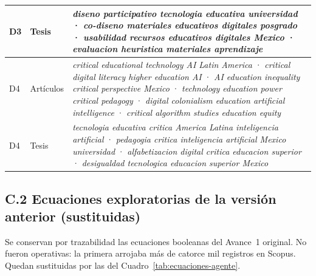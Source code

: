 \documentclass[letter,12pt]{article}
\begin{document}
\begin{table}[H]
\begin{tabular}{|p{1.1cm}|p{1.3cm}|p{10.2cm}|}
\hline
D3 & Tesis & \textit{diseno participativo tecnologia educativa universidad} · \textit{co-diseno materiales educativos digitales posgrado} · \textit{usabilidad recursos educativos digitales Mexico} · \textit{evaluacion heuristica materiales aprendizaje} \\
\hline
D4 & Artículos & \textit{critical educational technology AI Latin America} · \textit{critical digital literacy higher education AI} · \textit{AI education inequality critical perspective Mexico} · \textit{technology education power critical pedagogy} · \textit{digital colonialism education artificial intelligence} · \textit{critical algorithm studies education equity} \\
\hline
D4 & Tesis & \textit{tecnologia educativa critica America Latina inteligencia artificial} · \textit{pedagogia critica inteligencia artificial Mexico universidad} · \textit{alfabetizacion digital critica educacion superior} · \textit{desigualdad tecnologica educacion superior Mexico} \\
\hline
\end{tabular}
\end{table}

\subsection*{C.2 Ecuaciones exploratorias de la versión anterior (sustituidas)}

Se conservan por trazabilidad las ecuaciones booleanas del Avance~1 original. No fueron operativas: la primera arrojaba más de catorce mil registros en Scopus. Quedan sustituidas por las del Cuadro~\ref{tab:ecuaciones-agente}.
\end{document}

